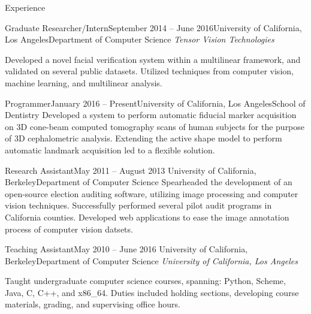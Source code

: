 \documentclass{resume}
\begin{document}
\begin{component}{Experience}
	\begin{position}{Graduate Researcher/Intern}{September 2014 -- June 2016}{University of California, Los Angeles}{Department of Computer Science}
	\emph{Tensor Vision Technologies}

		Developed a novel facial verification system within a multilinear framework, and validated on several public datasets.
Utilized techniques from computer vision, machine learning, and multilinear analysis.
	\end{position}

    \begin{position}{Programmer}{January 2016 -- Present}{University of California, Los Angeles}{School of Dentistry}
      Developed a system to perform automatic fiducial marker acquisition on 3D cone-beam computed tomography scans of human subjects for the purpose of 3D cephalometric analysis.
      Extending the active shape model to perform automatic landmark acquisition led to a flexible solution.
      \end{position}

	\begin{position}{Research Assistant}{May 2011 -- August 2013}
	 	{University of California, Berkeley}{Department of Computer Science}
	{Spearheaded the development of an open-source election auditing software,
     utilizing image processing and computer vision techniques. 
     Successfully performed
         several pilot audit programs in California counties.
     Developed web applications to ease the image annotation process of
     computer vision datsets.}
	\end{position}

	\begin{position}{Teaching Assistant}{May 2010 -- June 2016}
		{University of California, Berkeley}{Department of Computer Science}
    \emph{University of California, Los Angeles}

	{Taught undergraduate computer science courses, spanning: Python, Scheme, Java, C, C++, and x86\_64.
	 Duties included holding sections, developing course materials, grading, and supervising office hours.}
	\end{position}
\end{component}

\vspace{-0.5em}
\end{document}
